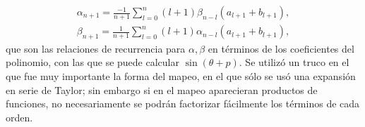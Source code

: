 \begin{eqnarray}
\alpha_{n+1}=\frac{-1}{n+1}\sum_{l=0}^{n}(l+1)\beta_{n-l}(a_{l+1}+b_{l+1}),
\label{recurrencia alpha}
\end{eqnarray}
\begin{eqnarray}
\beta_{n+1}=\frac{1}{n+1}\sum_{l=0}^{n}(l+1)\alpha_{n-l}(a_{l+1}+b_{l+1}),
\label{recurrencia beta}
\end{eqnarray}
que son las relaciones de recurrencia para $\alpha,\beta$ en términos de los coeficientes del polinomio, con las que se puede calcular $\sin(\theta+p)$. Se utilizó un truco en el que fue muy importante la forma del mapeo, en el que sólo se usó una expansión en serie de Taylor; sin embargo si en el mapeo aparecieran productos de funciones, no necesariamente se podrán factorizar fácilmente los términos de cada orden.\\

